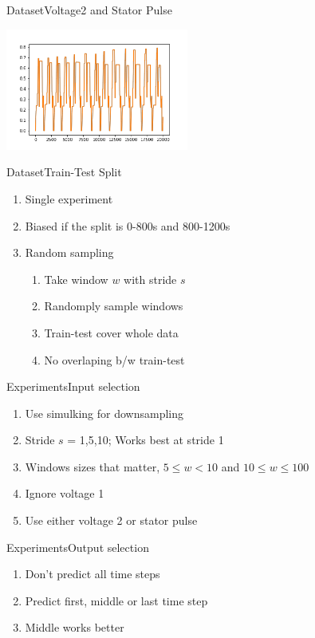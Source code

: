 \documentclass[handout]{beamer}
\begin{document}
\begin{frame}{Dataset}{Voltage2 and Stator Pulse}
\begin{center}
  \includegraphics[width=0.8\linewidth, height=4cm]{images/voltage2_stator_pulse}
\end{center}
\end{frame}

\begin{frame}{Dataset}{Train-Test Split}
  \begin{enumerate}
    \item Single experiment
    \item Biased if the split is 0-800s and 800-1200s
    \item Random sampling
      \begin{enumerate}
        \item Take window $w$ with stride $s$
        \item Randomply sample windows
        \item Train-test cover whole data
        \item No overlaping b/w train-test
      \end{enumerate}
  \end{enumerate}
\end{frame}

\begin{frame}{Experiments}{Input selection}
  \begin{enumerate}
    \item Use simulking for downsampling
    \item Stride $s$ = 1,5,10; Works best at stride 1
    \item Windows sizes that matter, $5\leq w<10$ and $10\leq w \leq100$
    \item Ignore voltage 1
    \item Use either voltage 2 or stator pulse
  \end{enumerate}
\end{frame}

\begin{frame}{Experiments}{Output selection}
  \begin{enumerate}
    \item Don't predict all time steps
    \item Predict first, middle or last time step
    \item Middle works better
  \end{enumerate}
\end{frame}
\end{document}
